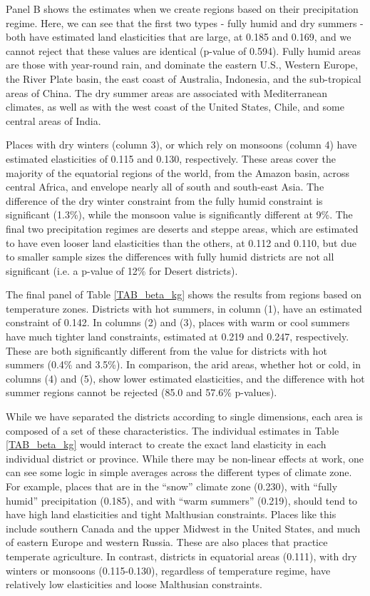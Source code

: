Panel B shows the estimates when we create regions based on their precipitation regime. Here, we can see that the first two types - fully humid and dry summers - both have estimated land elasticities that are large, at 0.185 and 0.169, and we cannot reject that these values are identical (p-value of 0.594). Fully humid areas are those with year-round rain, and dominate the eastern U.S., Western Europe, the River Plate basin, the east coast of Australia, Indonesia, and the sub-tropical areas of China. The dry summer areas are associated with Mediterranean climates, as well as with the west coast of the United States, Chile, and some central areas of India.

Places with dry winters (column 3), or which rely on monsoons (column 4) have estimated elasticities of 0.115 and 0.130, respectively. These areas cover the majority of the equatorial regions of the world, from the Amazon basin, across central Africa, and envelope nearly all of south and south-east Asia. The difference of the dry winter constraint from the fully humid constraint is significant (1.3\%), while the monsoon value is significantly different at 9\%. The final two precipitation regimes are deserts and steppe areas, which are estimated to have even looser land elasticities than the others, at 0.112 and 0.110, but due to smaller sample sizes the differences with fully humid districts are not all significant (i.e. a p-value of 12\% for Desert districts).

The final panel of Table \ref{TAB_beta_kg} shows the results from regions based on temperature zones. Districts with hot summers, in column (1), have an estimated constraint of 0.142. In columns (2) and (3), places with warm or cool summers have much tighter land constraints, estimated at 0.219 and 0.247, respectively. These are both significantly different from the value for districts with hot summers (0.4\% and 3.5\%). In comparison, the arid areas, whether hot or cold, in columns (4) and (5), show lower estimated elasticities, and the difference with hot summer regions cannot be rejected (85.0 and 57.6\% p-values).

While we have separated the districts according to single dimensions, each area is composed of a set of these characteristics. The individual estimates in Table \ref{TAB_beta_kg} would interact to create the exact land elasticity in each individual district or province. While there may be non-linear effects at work, one can see some logic in simple averages across the different types of climate zone. For example, places that are in the ``snow'' climate zone (0.230), with ``fully humid'' precipitation (0.185), and with ``warm summers'' (0.219), should tend to have high land elasticities and tight Malthusian constraints. Places like this include southern Canada and the upper Midwest in the United States, and much of eastern Europe and western Russia. These are also places that practice temperate agriculture. In contrast, districts in equatorial areas (0.111), with dry winters or monsoons (0.115-0.130), regardless of temperature regime, have relatively low elasticities and loose Malthusian constraints.

